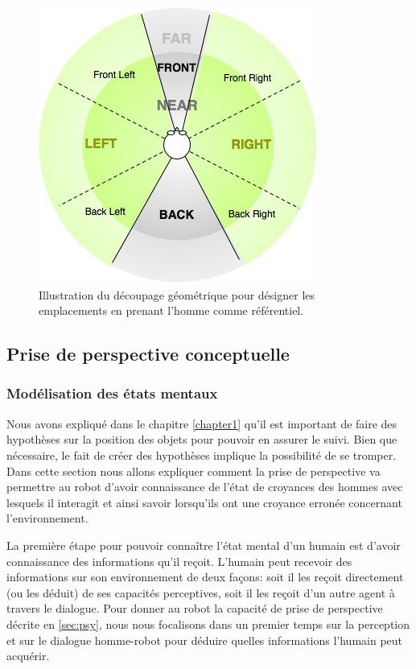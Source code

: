\documentclass[a4paper,11pt,twoside]{StyleThese}
\begin{document}
\begin{figure}[ht!]
 \centering
  \includegraphics[width=0.59\linewidth]{./img/relative_position.jpg} 
  \caption {Illustration du découpage géométrique pour désigner les emplacements en prenant l'homme comme référentiel.}
  \label{fig:relativePose}
\end{figure}


\subsection{Prise de perspective conceptuelle}
\label{sec:beliefm}
\subsubsection{Modélisation des états mentaux}
Nous avons expliqué dans le chapitre \ref{chapter1} qu'il est important de faire des hypothèses sur la position des objets pour pouvoir en assurer le suivi. Bien que nécessaire, le fait de créer des hypothèses implique la possibilité de se tromper.
Dans cette section nous allons expliquer comment la prise de perspective va permettre au robot d'avoir connaissance de l'état de croyances des hommes avec lesquels il interagit et ainsi savoir lorsqu'ils ont une croyance erronée concernant l'environnement.

La première étape pour pouvoir connaître l'état mental d'un humain est d'avoir connaissance des informations qu'il reçoit. L'humain peut recevoir des informations sur son environnement de deux façons: soit il les reçoit directement (ou les déduit) de ses capacités perceptives, soit il les reçoit d'un autre agent à travers le dialogue.
Pour donner au robot la capacité de prise de perspective décrite en \ref{sec:psy}, nous nous focalisons dans un premier temps sur la perception et sur le dialogue homme-robot pour déduire quelles informations l'humain peut acquérir.
\end{document}
